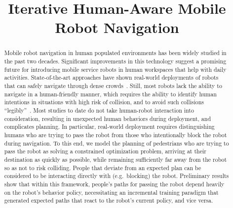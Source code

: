 \documentclass[conference]{IEEEtran}
\begin{document}
\title{Iterative Human-Aware Mobile Robot Navigation}


\author{
}


\maketitle

\begin{abstract}
Mobile robot navigation in human populated environments has been
widely studied in the past two decades. Significant improvements in
this technology suggest a promising future for introducing mobile
service robots in human workspaces that help with daily
activities. State-of-the-art approaches have shown real-world
deployments of robots that can safely navigate through dense
crowds~\cite{trautman2015robot, pfeiffer2016predicting}. Still, most
robots lack the ability to navigate in a human-friendly manner, which
requires the ability to identify human intentions in situations with
high risk of collision, and to avoid such collisions
“legibly”~\cite{dragan2013legibility}. Most studies to date do not
take human-robot interaction into consideration, resulting in
unexpected human behaviors during deployment, and complicates
planning.  In particular, real-world deployment requires
distinguishing humans who are trying to pass the robot from those who
intentionally block the robot during navigation.  To this end, we
model the planning of pedestrians who are trying to pass the robot as
solving a constrained optimization problem, arriving at their
destination as quickly as possible, while remaining sufficiently far
away from the robot so as not to risk colliding.  People that deviate
from an expected plan can be considered to be interacting directly
with (e.g.\ blocking) the robot.  Preliminary results show that within
this framework, people's paths for passing the robot depend heavily on
the robot's behavior policy, necessitating an incremental training
paradigm that generated expected paths that react to the robot's
current policy, and vice versa.

\end{abstract}

\IEEEpeerreviewmaketitle
\end{document}
